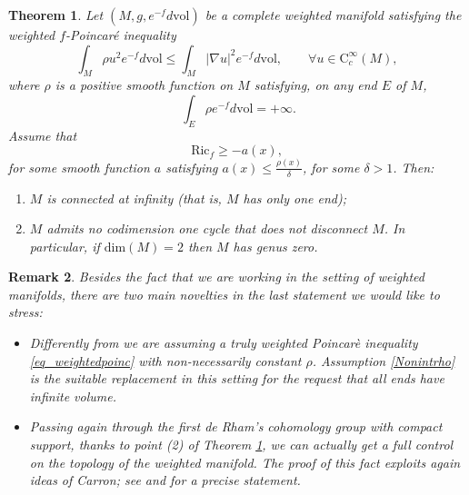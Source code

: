 \documentclass[11pt, leqno]{amsart}
\newtheorem{theorem}{Theorem}[section]
\newtheorem{remark}[theorem]{Remark}
\begin{document}
\begin{theorem}\label{MainA}
Let $(M,g,e^{-f}d\mathrm{vol})$ be a complete weighted manifold satisfying the weighted $f$-Poincar\'e inequality
\begin{equation}\label{eq_weightedpoinc}
\int_M\rho u^2e^{-f}d\mathrm{vol}\leq \int_M |\nabla u|^2e^{-f}d\mathrm{vol},\qquad \forall u\in\mathrm{C}^\infty_c(M),
\end{equation}
where $\rho$ is a positive smooth function on $M$ satisfying, on any end $E$ of $M$,
\begin{equation}\label{Nonintrho}
\ \int_{E}\rho e^{-f}d\mathrm{vol}=+\infty.
\end{equation}
Assume that
\[\mathrm{Ric}_f\geq-a(x),\]
for some smooth function $a$ satisfying $a(x)\leq\frac{\rho(x)}{\delta}$, for some $\delta>1$. Then:
\begin{enumerate}
\item  $M$ is connected at infinity (that is, $M$ has only one end);
\item $M$ admits no codimension one cycle that does not disconnect $M$. In particular, if $\mathrm{dim}(M)=2$ then $M$ has genus zero.
\end{enumerate}
\end{theorem}

\begin{remark}
\rm{Besides the fact that we are working in the setting of weighted manifolds, there are two main novelties in the last statement we would like to stress:
\begin{itemize}
\item[(i)] Differently from \cite{Carron_LectNotes} we are assuming a truly weighted Poincar\`e inequality \eqref{eq_weightedpoinc} with non-necessarily constant $\rho$. Assumption \eqref{Nonintrho} is the suitable replacement in this setting for the request that all ends have infinite volume. 
\item[(ii)] Passing again through the first de Rham's cohomology group with compact support, thanks to point (2) of Theorem \ref{MainA}, we can actually get a full control on the topology of the weighted manifold. The proof of this fact exploits again ideas of Carron; see \cite{Carron_LectNotes} and \cite[Proposition 3.3]{KS} for a precise statement.
\end{itemize}}
\end{remark}
\end{document}
